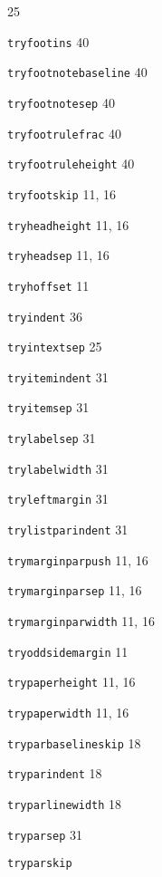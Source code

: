 \documentclass[11pt]{article}
\providecommand{\indexfill}{}
\begin{document}
\begin{theindex}
   25
\item \texttt  {\bs tryfootins}  \indexfill
   40
\item \texttt  {\bs tryfootnotebaseline}  \indexfill
   40
\item \texttt  {\bs tryfootnotesep}  \indexfill
   40
\item \texttt  {\bs tryfootrulefrac}  \indexfill
   40
\item \texttt  {\bs tryfootruleheight}  \indexfill
   40
\item \texttt  {\bs tryfootskip}  \indexfill
   11, 16
\item \texttt  {\bs tryheadheight}  \indexfill
   11, 16
\item \texttt  {\bs tryheadsep}  \indexfill
   11, 16
\item \texttt  {\bs tryhoffset}  \indexfill
   11
\item \texttt  {\bs tryindent}  \indexfill
   36
\item \texttt  {\bs tryintextsep}  \indexfill
   25
\item \texttt  {\bs tryitemindent}  \indexfill
   31
\item \texttt  {\bs tryitemsep}  \indexfill
   31
\item \texttt  {\bs trylabelsep}  \indexfill
   31
\item \texttt  {\bs trylabelwidth}  \indexfill
   31
\item \texttt  {\bs tryleftmargin}  \indexfill
   31
\item \texttt  {\bs trylistparindent}  \indexfill
   31
\item \texttt  {\bs trymarginparpush}  \indexfill
   11, 16
\item \texttt  {\bs trymarginparsep}  \indexfill
   11, 16
\item \texttt  {\bs trymarginparwidth}  \indexfill
   11, 16
\item \texttt  {\bs tryoddsidemargin}  \indexfill
   11
\item \texttt  {\bs trypaperheight}  \indexfill
   11, 16
\item \texttt  {\bs trypaperwidth}  \indexfill
   11, 16
\item \texttt  {\bs tryparbaselineskip}  \indexfill
   18
\item \texttt  {\bs tryparindent}  \indexfill
   18
\item \texttt  {\bs tryparlinewidth}  \indexfill
   18
\item \texttt  {\bs tryparsep}  \indexfill
   31
\item \texttt  {\bs tryparskip}  \indexfill

\end{theindex}
\end{document}
